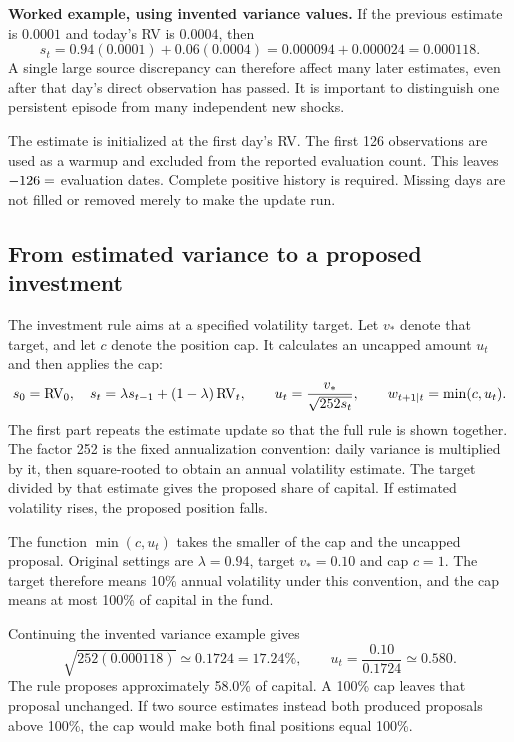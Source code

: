 \textbf{Worked example, using invented variance values.} If the previous estimate is $0.0001$ and today's RV is $0.0004$, then
\[
 s_t=0.94(0.0001)+0.06(0.0004)
     =0.000094+0.000024=0.000118.
\]
A single large source discrepancy can therefore affect many later estimates, even after that day's direct observation has passed. It is important to distinguish one persistent episode from many independent new shocks.

The estimate is initialized at the first day's RV. The first 126 observations are used as a warmup and excluded from the reported evaluation count. This leaves $\Fact{sessions}-126=\Fact{origins}$ evaluation dates. Complete positive history is required. Missing days are not filled or removed merely to make the update run.

\subsection{From estimated variance to a proposed investment}
The investment rule aims at a specified volatility target. Let $v_*$ denote that target, and let $c$ denote the position cap. It calculates an uncapped amount $u_t$ and then applies the cap:
\begin{equation}
 s_0=\operatorname{RV}_0,\quad s_t=\lambda s_{t-1}+(1-\lambda)\operatorname{RV}_t,\qquad
 u_t=\frac{v_*}{\sqrt{252s_t}},\qquad
 w_{t+1|t}=\min(c,u_t).\label{eq:weight}
\end{equation}
The first part repeats the estimate update so that the full rule is shown together. The factor 252 is the fixed annualization convention: daily variance is multiplied by it, then square-rooted to obtain an annual volatility estimate. The target divided by that estimate gives the proposed share of capital. If estimated volatility rises, the proposed position falls.

The function $\min(c,u_t)$ takes the smaller of the cap and the uncapped proposal. Original settings are $\lambda=0.94$, target $v_*=0.10$ and cap $c=1$. The target therefore means 10\% annual volatility under this convention, and the cap means at most 100\% of capital in the fund.

Continuing the invented variance example gives
\[
 \sqrt{252(0.000118)}\simeq0.1724=17.24\%,\qquad
 u_t=\frac{0.10}{0.1724}\simeq0.580.
\]
The rule proposes approximately 58.0\% of capital. A 100\% cap leaves that proposal unchanged. If two source estimates instead both produced proposals above 100\%, the cap would make both final positions equal 100\%.

